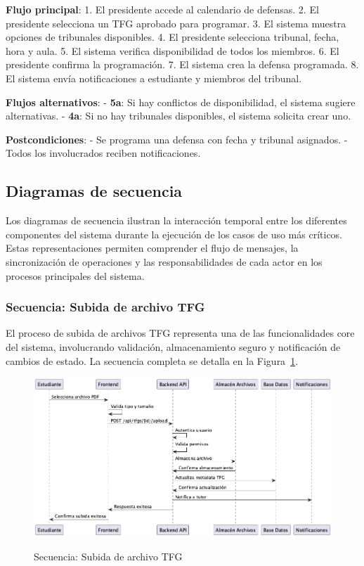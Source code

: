 \documentclass[12pt,a4paper,oneside]{report}
\providecommand{\pandocbounded}[1]{#1}
\begin{document}
\textbf{Flujo principal}: 1. El presidente accede al calendario de
defensas. 2. El presidente selecciona un TFG aprobado para programar. 3.
El sistema muestra opciones de tribunales disponibles. 4. El presidente
selecciona tribunal, fecha, hora y aula. 5. El sistema verifica
disponibilidad de todos los miembros. 6. El presidente confirma la
programación. 7. El sistema crea la defensa programada. 8. El sistema
envía notificaciones a estudiante y miembros del tribunal.

\textbf{Flujos alternativos}: - \textbf{5a}: Si hay conflictos de
disponibilidad, el sistema sugiere alternativas. - \textbf{4a}: Si no
hay tribunales disponibles, el sistema solicita crear uno.

\textbf{Postcondiciones}: - Se programa una defensa con fecha y tribunal
asignados. - Todos los involucrados reciben notificaciones.

\subsection{Diagramas de secuencia}\label{diagramas-de-secuencia}

Los diagramas de secuencia ilustran la interacción temporal entre los diferentes componentes del sistema durante la ejecución de los casos de uso más críticos. Estas representaciones permiten comprender el flujo de mensajes, la sincronización de operaciones y las responsabilidades de cada actor en los procesos principales del sistema.

\subsubsection{Secuencia: Subida de archivo
TFG}\label{secuencia-subida-de-archivo-tfg}

El proceso de subida de archivos TFG representa una de las funcionalidades core del sistema, involucrando validación, almacenamiento seguro y notificación de cambios de estado. La secuencia completa se detalla en la Figura~\ref{fig:secuencia-subida-archivo}.

\begin{figure}[H]
\centering
\pandocbounded{\includegraphics[keepaspectratio,alt={Secuencia: Subida de archivo TFG}]{processed/images/04_analisis_sistema_plantuml_1.png}}
\caption{Secuencia: Subida de archivo TFG}
\label{fig:secuencia-subida-archivo}
\end{figure}
\end{document}
